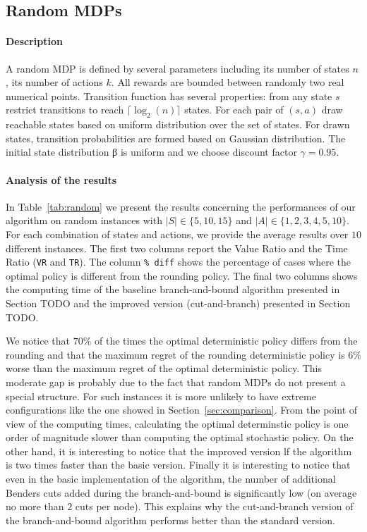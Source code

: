 \subsection{Random MDPs}
\paragraph{Description}
A random MDP is defined by several parameters including its number of states $n$ , its number of actions $k$. All rewards are bounded between randomly two real numerical points. Transition function has several properties: from any state $s$ restrict transitions to reach $\lceil \log_2(n) \rceil$ states. For each pair of $(s, a)$ draw reachable states based on uniform
distribution over the set of states. For drawn states, transition probabilities are formed based on Gaussian distribution.
The initial state distribution β is uniform and we choose discount factor $\gamma = 0.95$. 
\paragraph{Analysis of the results}
In Table~\ref{tab:random} we present the results concerning the performances of our algorithm on random instances with $|S| \in \{5,10,15\}$ and $|A| \in \{1, 2, 3, 4, 5, 10\}$. For each combination of states and actions, we provide the average results over $10$ different instances. The first two columns report the Value Ratio and the Time Ratio (\texttt{VR} and \texttt{TR}). The column \texttt{\% diff} shows the percentage of cases where the optimal policy is different from the rounding policy. The final two columns shows the computing time of the baseline branch-and-bound algorithm presented in Section TODO and the improved version (cut-and-branch) presented in Section TODO.

We notice that $70\%$ of the times the optimal deterministic policy differs from the rounding and that the maximum regret of the rounding deterministic policy is $6\%$ worse than the maximum regret of the optimal deterministic policy. This moderate gap is probably due to the fact that random MDPs do not present a special structure. For such instances it is more unlikely to have extreme configurations like the one showed in Section~\ref{sec:comparison}. From the point of view of the computing times, calculating the optimal determinstic policy is one order of magnitude slower than computing the optimal stochastic policy. On the other hand, it is interesting to notice that the improved version lf the algorithm is two times faster than the basic version.  
Finally it is interesting to notice that even in the basic implementation of the algorithm, the number of additional Benders cuts added during the branch-and-bound is significantly low (on average no more than $2$ cuts per node). This explains why the cut-and-branch version of the branch-and-bound algorithm performs better than the standard version.


